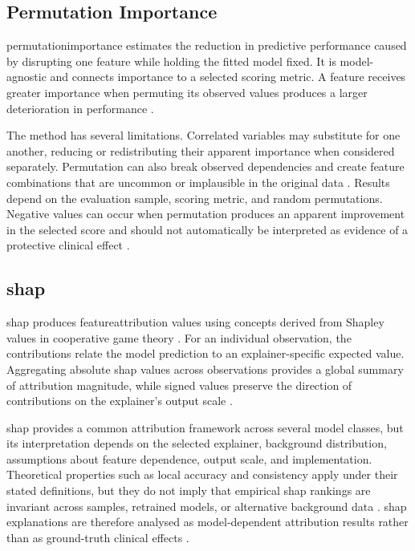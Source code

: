 \subsection{Permutation Importance}

\Gls{permutationimportance} estimates the reduction in predictive performance caused by disrupting one feature while holding the fitted model fixed. It is model-agnostic and connects importance to a selected scoring metric. A feature receives greater importance when permuting its observed values produces a larger deterioration in performance \citep{fisher_models_2019}.

The method has several limitations. Correlated variables may substitute for one another, reducing or redistributing their apparent importance when considered separately. Permutation can also break observed dependencies and create feature combinations that are uncommon or implausible in the original data \citep{strobl_conditional_2008, fisher_models_2019}. Results depend on the evaluation sample, scoring metric, and random permutations. Negative values can occur when permutation produces an apparent improvement in the selected score and should not automatically be interpreted as evidence of a protective clinical effect \citep{fisher_models_2019}.

\subsection{\gls{shap}}

\gls{shap} produces \gls{featureattribution} values using concepts derived from Shapley values in cooperative game theory \citep{NIPS2017_8a20a862}. For an individual observation, the contributions relate the model prediction to an explainer-specific expected value. Aggregating absolute \gls{shap} values across observations provides a global summary of attribution magnitude, while signed values preserve the direction of contributions on the explainer's output scale \citep{NIPS2017_8a20a862, poncebobadilla_practical_2024}.

\gls{shap} provides a common attribution framework across several model classes, but its interpretation depends on the selected explainer, background distribution, assumptions about feature dependence, output scale, and implementation. Theoretical properties such as local accuracy and consistency apply under their stated definitions, but they do not imply that empirical \gls{shap} rankings are invariant across samples, retrained models, or alternative background data \citep{NIPS2017_8a20a862, poncebobadilla_practical_2024}. \gls{shap} explanations are therefore analysed as model-dependent attribution results rather than as ground-truth clinical effects \citep{vilone_classification_2021}.

